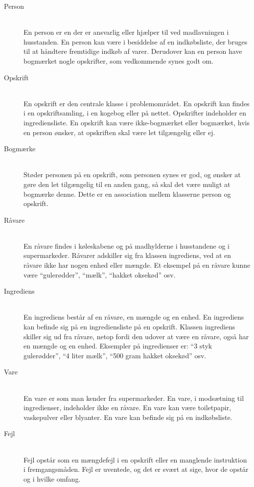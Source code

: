 \begin{description}
\item[Person] \hfill \\
En person er en der er ansvarlig eller hjælper til ved madlavningen i husstanden. En person kan være i besiddelse af en indkøbsliste, der bruges til at håndtere fremtidige indkøb af varer. Derudover kan en person have bogmærket nogle opskrifter, som vedkommende synes godt om.

\item[Opskrift] \hfill \\
En opskrift er den centrale klasse i problemområdet. En opskrift kan findes i en opskriftsamling, i en kogebog eller på nettet. Opskrifter indeholder en ingrediensliste. En opskrift kan være ikke-bogmærket eller bogmærket, hvis en person ønsker, at opskriften skal være let tilgængelig eller ej.

\item[Bogmærke] \hfill \\
Støder personen på en opskrift, som personen synes er god, og ønsker at gøre den let tilgængelig til en anden gang, så skal det være muligt at bogmærke denne. Dette er en association mellem klasserne person og opskrift.

\item[Råvare] \hfill \\
En råvare findes i køleskabene og på madhylderne i husstandene og i supermarkeder. Råvarer adskiller sig fra klassen ingrediens, ved at en råvare ikke har nogen enhed eller mængde. Et eksempel på en råvare kunne være ``gulerødder'', ``mælk'', ``hakket oksekød'' osv. 

\item[Ingrediens] \hfill \\ 
En ingrediens består af en råvare, en mængde og en enhed. En ingrediens kan befinde sig på en ingrediensliste på en opskrift. Klassen ingrediens skiller sig ud fra råvare, netop fordi den udover at være en råvare, også har en mængde og en enhed. Eksempler på ingredienser er: ``3 styk gulerødder'', ``4 liter mælk'', ``500 gram hakket oksekød'' osv.

\item[Vare] \hfill \\
En vare er som man kender fra supermarkeder. En vare, i modsætning til ingredienser, indeholder ikke en råvare. En vare kan \fx være toiletpapir, vaskepulver eller blyanter. En vare kan befinde sig på en indkøbsliste.

\item[Fejl] \hfill \\
Fejl opstår som \fx en mængdefejl i en opskrift eller en manglende instruktion i fremgangsmåden. Fejl er uventede, og det er svært at sige, hvor de opstår og i hvilke omfang.

\end{description}

